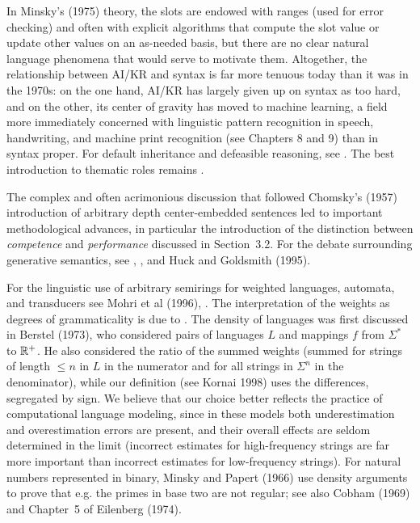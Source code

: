 In Minsky's (1975) theory, the slots are endowed with ranges (used for error
checking) and often with explicit algorithms that compute the slot value or
update other values on an as-needed basis, but there are no clear natural
language phenomena that would serve to motivate them. Altogether, the
relationship between AI/KR and syntax is far more tenuous today than it was in
the 1970s: on the one hand, AI/KR has largely given up on syntax as too hard,
and on the other, its center of gravity has moved to machine learning, a field
more immediately concerned with linguistic pattern recognition in speech,
handwriting, and machine print recognition (see Chapters 8 and 9) than in
syntax proper. For default inheritance and defeasible reasoning, see
.  The best introduction to thematic roles remains
.  \nocite{Minsky:1975}

The complex and often acrimonious discussion that followed Chomsky's (1957)
introduction of arbitrary depth center-embedded sentences led to important
methodological advances, in particular the introduction of the distinction
between {\it competence} and {\it performance} \cite{Chomsky:1965} discussed
in Section~3.2. For the debate surrounding generative semantics, see
, \nocite{Huck:1995}, and Huck
and Goldsmith (1995).

For the linguistic use of arbitrary semirings for weighted languages,
automata, and transducers see Mohri et al (1996), .  The
interpretation of the weights as degrees of\nocite{Mohri:1996} grammaticality
is due to .  The density of languages was first
discussed in Berstel (1973), who considered pairs of languages $L$ and
mappings $f$ from $\Sigma^*$ to ${\Bbb R}^+$. He also considered the ratio of
the summed weights (summed for strings of length $\leq n$ in $L$ in the
numerator and for all strings in $\Sigma^n$ in the denominator), while our
definition (see Kornai 1998)\nocite{Kornai:1998} uses the differences,
segregated by sign.  We believe that our choice better reflects the practice
of computational language modeling, since in these models both underestimation
and overestimation errors are present, and their overall effects are seldom
determined in the limit (incorrect estimates for high-frequency strings are
far more important than incorrect estimates for low-frequency strings).  For
natural numbers represented in binary, Minsky and Papert (1966) use density
arguments to prove that e.g. the primes in base two are not regular; see also
Cobham (1969) and Chapter~5 of Eilenberg (1974).\nocite{Minsky:1966}
\nocite{Cobham:1969}\nocite{Eilenberg:1974}

